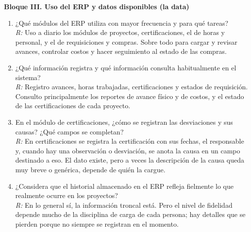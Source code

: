 \documentclass{univalle-perfil}
\begin{document}
\noindent\textbf{Bloque III. Uso del ERP y datos disponibles (la data)}
\begin{enumerate}\setlength{\itemsep}{6pt}\setlength{\parskip}{0pt}
  \item ¿Qué módulos del ERP utiliza con mayor frecuencia y para qué tareas?\\
  \textit{R:} Uso a diario los módulos de proyectos, certificaciones, el de horas y personal, y el de requisiciones y compras. Sobre todo para cargar y revisar avances, controlar costos y hacer seguimiento al estado de las compras.

  \item ¿Qué información registra y qué información consulta habitualmente en el sistema?\\
  \textit{R:} Registro avances, horas trabajadas, certificaciones y estados de requisición. Consulto principalmente los reportes de avance físico y de costos, y el estado de las certificaciones de cada proyecto.

  \item En el módulo de certificaciones, ¿cómo se registran las desviaciones y sus causas? ¿Qué campos se completan?\\
  \textit{R:} En certificaciones se registra la certificación con sus fechas, el responsable y, cuando hay una observación o desviación, se anota la causa en un campo destinado a eso. El dato existe, pero a veces la descripción de la causa queda muy breve o genérica, depende de quién la cargue.

  \item ¿Considera que el historial almacenado en el ERP refleja fielmente lo que realmente ocurre en los proyectos?\\
  \textit{R:} En lo general sí, la información troncal está. Pero el nivel de fidelidad depende mucho de la disciplina de carga de cada persona; hay detalles que se pierden porque no siempre se registran en el momento.
\end{enumerate}
\end{document}
